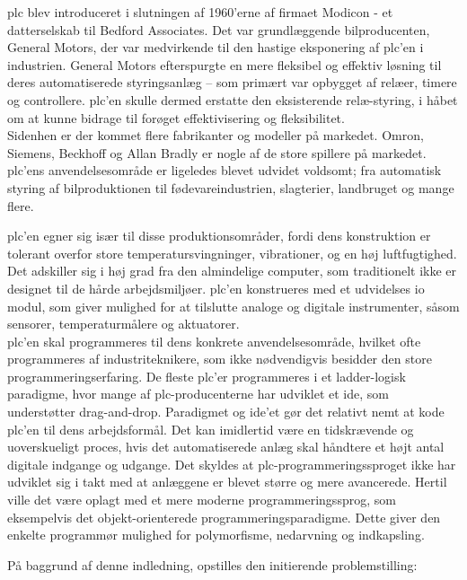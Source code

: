 \gls{plc} blev introduceret i slutningen af 1960'erne af firmaet Modicon - et datterselskab til Bedford Associates. Det var grundlæggende bilproducenten, General Motors, der var medvirkende til den hastige eksponering af \gls{plc}'en i industrien. General Motors efterspurgte en mere fleksibel og effektiv løsning til deres automatiserede styringsanlæg – som primært var opbygget af relæer, timere og controllere. \gls{plc}'en skulle dermed erstatte den eksisterende relæ-styring, i håbet om at kunne bidrage til forøget effektivisering og fleksibilitet. \\

\noindent Sidenhen er der kommet flere fabrikanter og modeller på markedet. Omron, Siemens, Beckhoff og Allan Bradly er nogle af de store spillere på markedet. \gls{plc}'ens anvendelsesområde er ligeledes blevet udvidet voldsomt; fra automatisk styring af bilproduktionen til fødevareindustrien, slagterier, landbruget og mange flere. 

\noindent \gls{plc}'en egner sig især til disse produktionsområder, fordi dens konstruktion er tolerant overfor store temperatursvingninger, vibrationer, og en høj luftfugtighed. Det adskiller sig i høj grad fra den almindelige computer, som traditionelt ikke er designet til de hårde arbejdsmiljøer. \gls{plc}'en konstrueres med et udvidelses \gls{io} modul, som giver mulighed for at tilslutte analoge og digitale instrumenter, såsom sensorer, temperaturmålere og aktuatorer. \\

\noindent \gls{plc}'en skal programmeres til dens konkrete anvendelsesområde, hvilket ofte programmeres af industriteknikere, som ikke nødvendigvis besidder den store programmeringserfaring. De fleste \gls{plc}'er programmeres i et ladder-logisk paradigme, hvor mange af \gls{plc}-producenterne har udviklet et \gls{ide}, som understøtter drag-and-drop. Paradigmet og \gls{ide}'et gør det relativt nemt at kode \gls{plc}'en til dens arbejdsformål. Det kan imidlertid være en tidskrævende og uoverskueligt proces, hvis det automatiserede anlæg skal håndtere et højt antal digitale indgange og udgange. Det skyldes at \gls{plc}-programmeringssproget ikke har udviklet sig i takt med at anlæggene er blevet større og mere avancerede. Hertil ville det være oplagt med et mere moderne programmeringssprog, som eksempelvis det objekt-orienterede programmeringsparadigme. Dette giver den enkelte programmør mulighed for polymorfisme, nedarvning og indkapsling.

\noindent På baggrund af denne indledning, opstilles den initierende problemstilling: \\

